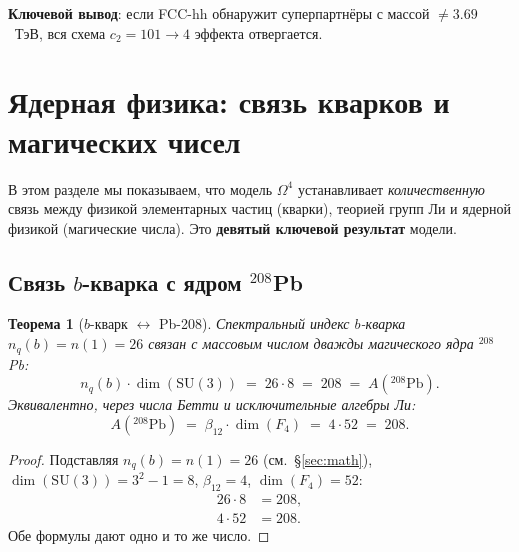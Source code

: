 \documentclass[11pt,a4paper]{article}
\newcommand{\SU}{\ensuremath{\mathrm{SU}}}
\newcommand{\Om}{\ensuremath{\Omega^4}}
\newtheorem{theorem}{Теорема}[section]
\theoremstyle{definition}
\begin{document}
\medskip\noindent
\textbf{Ключевой вывод}: если FCC-hh обнаружит суперпартнёры
с массой $\neq 3.69$~ТэВ, вся схема $c_2 = 101 \to 4$ эффекта
отвергается.

\section{Ядерная физика: связь кварков и магических чисел}
\label{sec:nuclear}

В этом разделе мы показываем, что модель $\Om$ устанавливает
\emph{количественную} связь между физикой элементарных частиц
(кварки), теорией групп Ли и ядерной физикой (магические числа).
Это \textbf{девятый ключевой результат} модели.

\subsection{Связь $b$-кварка с ядром $^{208}$Pb}
\label{subsec:b-quark-pb208}

\begin{theorem}[$b$-кварк $\leftrightarrow$ Pb-208]
\label{thm:b-quark-pb}
Спектральный индекс $b$-кварка $n_q(b) = n(1) = 26$
связан с массовым числом дважды магического ядра $^{208}$Pb:
\begin{equation}
    \boxed{
    n_q(b) \cdot \dim(\SU(3)) \;=\; 26 \cdot 8 \;=\; 208 \;=\; A(^{208}\text{Pb}).
    }
    \label{eq:b-quark-pb208}
\end{equation}
Эквивалентно, через числа Бетти и исключительные алгебры Ли:
\begin{equation}
    A(^{208}\text{Pb}) \;=\; \beta_{12} \cdot \dim(F_4) \;=\; 4 \cdot 52 \;=\; 208.
    \label{eq:pb208-alt}
\end{equation}
\end{theorem}

\begin{proof}
Подставляя $n_q(b) = n(1) = 26$ (см.~\S\ref{sec:math}),
$\dim(\SU(3)) = 3^2 - 1 = 8$, $\beta_{12} = 4$,
$\dim(F_4) = 52$:
\begin{align}
    26 \cdot 8 &= 208, \\
    4 \cdot 52 &= 208.
\end{align}
Обе формулы дают одно и то же число.
\end{proof}
\end{document}
